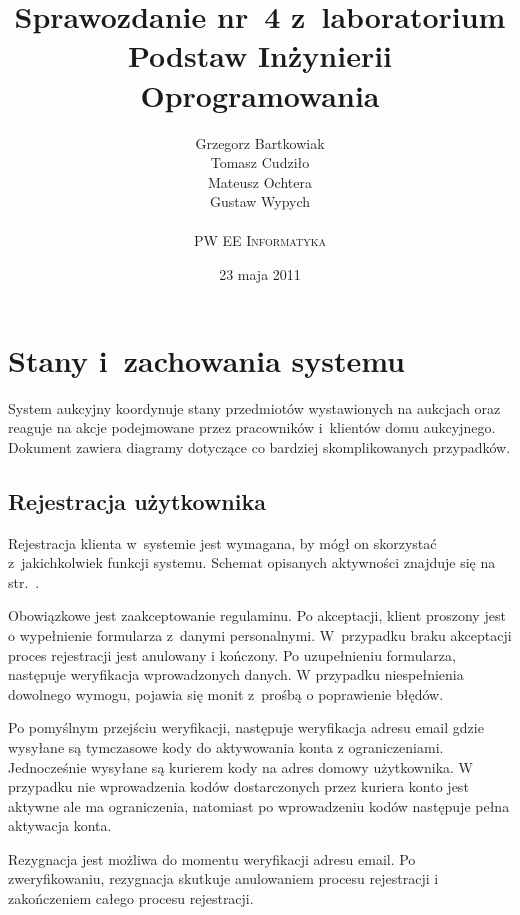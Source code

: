 \documentclass[10pt,a4paper]{article}
\begin{document}
\title{
  Sprawozdanie nr~4 z~laboratorium\\Podstaw Inżynierii Oprogramowania
}
\author{
  Grzegorz Bartkowiak\\
  Tomasz Cudziło\\
  Mateusz Ochtera\\
  Gustaw Wypych\\
  \\
  \textsc{PW EE Informatyka}\\[10pt]
}
\date{23 maja 2011}
\maketitle

\section{Stany i~zachowania systemu}

System aukcyjny koordynuje stany przedmiotów wystawionych na aukcjach oraz
reaguje na akcje podejmowane przez pracowników i~klientów domu aukcyjnego.
Dokument zawiera diagramy dotyczące co bardziej skomplikowanych przypadków.

\subsection{Rejestracja użytkownika}

Rejestracja klienta w~systemie jest wymagana, by mógł on skorzystać
z~jakichkolwiek funkcji systemu. Schemat opisanych aktywności znajduje się na
str.~\pageref{fig:aktywnosc_rejestracja_uzytkownika}.

Obowiązkowe jest zaakceptowanie regulaminu. Po akceptacji, klient proszony jest
o wypełnienie formularza z~danymi personalnymi. W~przypadku braku akceptacji
proces rejestracji jest anulowany i kończony. Po uzupełnieniu formularza,
następuje weryfikacja wprowadzonych danych. W przypadku niespełnienia dowolnego
wymogu, pojawia się monit z~prośbą o poprawienie błędów.

Po pomyślnym przejściu weryfikacji, następuje weryfikacja adresu email gdzie
wysyłane są tymczasowe kody do aktywowania konta z ograniczeniami. Jednocześnie
wysyłane są kurierem kody na adres domowy użytkownika. W przypadku nie
wprowadzenia kodów dostarczonych przez kuriera konto jest aktywne ale ma
ograniczenia, natomiast po wprowadzeniu kodów następuje pełna aktywacja konta.

Rezygnacja jest możliwa do momentu weryfikacji adresu email. Po zweryfikowaniu,
rezygnacja skutkuje anulowaniem procesu rejestracji i zakończeniem całego
procesu rejestracji.
\end{document}
